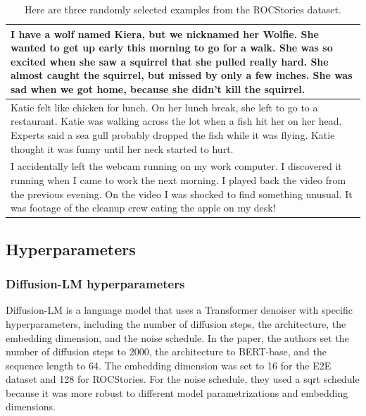 \begin{table}
  \centering
  \begin{tabular}{ | m{12cm}| } 
    \hline
    I have a wolf named Kiera, but we nicknamed her Wolfie. She wanted to get up early this morning to go for a walk. She was so excited when she saw a squirrel that she pulled really hard. She almost caught the squirrel, but missed by only a few inches. She was sad when we got home, because she didn't kill the squirrel. \\ \hline
    Katie felt like chicken for lunch. On her lunch break, she left to go to a restaurant. Katie was walking across the lot when a fish hit her on her head. Experts said a sea gull probably dropped the fish while it was flying. Katie thought it was funny until her neck started to hurt. \\ \hline
    I accidentally left the webcam running on my work computer. I discovered it running when I came to work the next morning. I played back the video from the previous evening. On the video I was shocked to find something unusual. It was footage of the cleanup crew eating the apple on my desk! \\
    \hline
  \end{tabular}
  \caption{Here are three randomly selected examples from the ROCStories dataset.}
  \label{fig:roc-stories-examples}
\end{table}

\subsection{Hyperparameters}

\subsubsection{Diffusion-LM hyperparameters}
Diffusion-LM is a language model that uses a Transformer denoiser with specific hyperparameters, including the number of diffusion steps, the architecture, the embedding dimension, and the noise schedule. In the paper, the authors set the number of diffusion steps to 2000, the architecture to BERT-base, and the sequence length to 64. The embedding dimension was set to 16 for the E2E dataset and 128 for ROCStories. For the noise schedule, they used a sqrt schedule because it was more robust to different model parametrizations and embedding dimensions.

